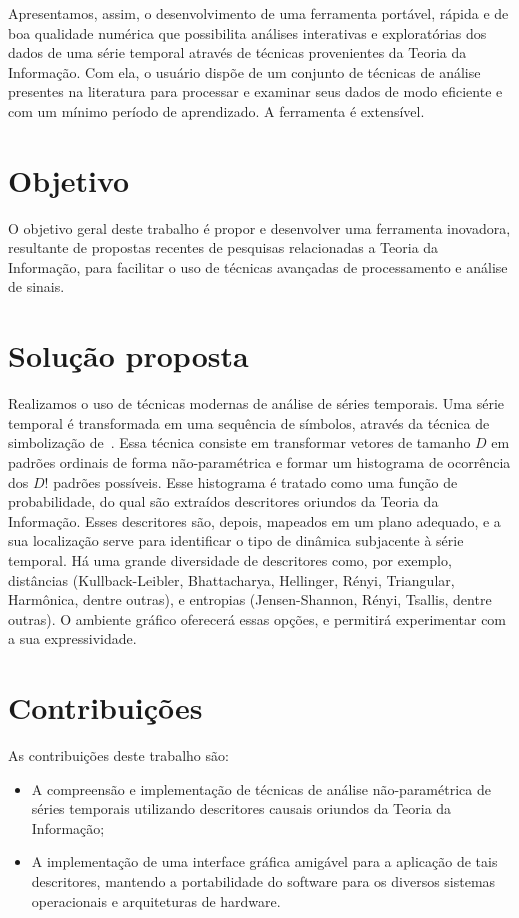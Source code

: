 Apresentamos, assim, o desenvolvimento de uma ferramenta portável, rápida e de boa qualidade numérica que possibilita análises interativas e exploratórias dos dados de uma série temporal através de técnicas provenientes da Teoria da Informação.
Com ela, o usuário dispõe de um conjunto de técnicas de análise presentes na literatura para processar e examinar seus dados de modo eficiente e com um mínimo período de aprendizado.
A ferramenta é extensível.

\section{Objetivo}

O objetivo geral deste trabalho é propor e desenvolver uma ferramenta inovadora, resultante de propostas recentes de pesquisas relacionadas a Teoria da Informação, para facilitar o uso de técnicas avançadas de processamento e análise de sinais.

\section{Solução proposta}

Realizamos o uso de técnicas modernas de análise de séries temporais. 
Uma série temporal é transformada em uma sequência de símbolos, através da técnica de simbolização de~\cite{article2}. 
Essa técnica consiste em transformar vetores de tamanho $D$ em padrões ordinais de forma não-paramétrica e formar um histograma de ocorrência dos $D!$ padrões possíveis. 
Esse histograma é tratado como uma função de probabilidade, do qual são extraídos descritores oriundos da Teoria da Informação. Esses descritores são, depois, mapeados em um plano adequado, e a sua localização serve para identificar o tipo de dinâmica subjacente à série temporal. 
Há uma grande diversidade de descritores como, por exemplo, distâncias (Kullback-Leibler, Bhattacharya, Hellinger, Rényi, Triangular, Harmônica, dentre outras), e entropias (Jensen-Shannon, Rényi, Tsallis, dentre outras). 
O ambiente gráfico oferecerá essas opções, e permitirá experimentar com a sua expressividade.

\section{Contribuições}

As contribuições deste trabalho são:

\begin{itemize}
\item A compreensão e implementação de técnicas de análise não-paramétrica de séries temporais utilizando descritores causais oriundos da Teoria da Informação;
\item A implementação de uma interface gráfica amigável para a aplicação de tais descritores, mantendo a portabilidade do software para os diversos sistemas operacionais e arquiteturas de hardware.
\end{itemize}

